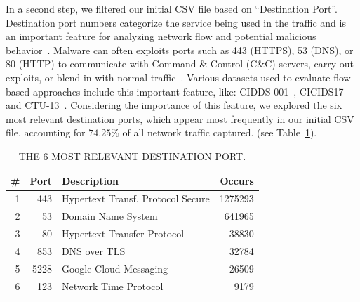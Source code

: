 In a second step, we filtered our initial CSV file based on ``Destination Port''. Destination port numbers categorize the service being used in the traffic and is an important feature for analyzing network flow and potential malicious behavior~\cite{DBLP:journals/compsec/UmerSB17,DBLP:journals/comsur/SperottoSSMPS10}. Malware can often exploits ports such as 443 (HTTPS), 53 (DNS), or 80 (HTTP) to communicate with Command \& Control (C\&C) servers, carry out exploits, or blend in with normal traffic~\cite{DBLP:journals/comsur/SperottoSSMPS10}. Various datasets used to evaluate flow-based approaches include this important feature, like: CIDDS-001~\cite{Ring2017FlowbasedBD}, CICIDS17~\cite{DBLP:conf/icict/MahfouzVS19} and CTU-13~\cite{DBLP:journals/compsec/GarciaGSZ14}. Considering the importance of this feature, we explored the six most relevant destination ports, which appear most frequently in our initial CSV file, accounting for $74.25\%$ of all network traffic captured. (see Table~\ref{tab:port}).

\begin{table}[h]
  \caption{THE 6 MOST RELEVANT DESTINATION PORT.}
  \centering
  \begin{small}
    \begin{tabular}{rrlr}   \hline
 \# & Port & Description & Occurs  \\ \hline

1 &  443 &  Hypertext Transf. Protocol Secure &  1275293  \\ 
  2 &  53 & Domain Name System & 641965  \\ 
  3 &  80 & Hypertext Transfer Protocol &  38830  \\ 
  4 &  853 & DNS over TLS &  32784  \\ 
  5 &  5228 & Google Cloud Messaging &  26509  \\ 
  6 &  123 & Network Time Protocol & 9179  \\ 
  
   \hline

 \end{tabular}
 \end{small}
 \label{tab:port}
 \end{table}


